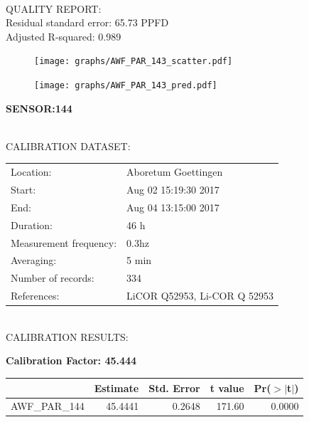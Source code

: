 \documentclass[oneside]{report}
\begin{document}
\hrulefill\\
QUALITY REPORT:\\
Residual standard error: 65.73 PPFD\\
Adjusted R-squared: 0.989



\begin{figure}[H]
  \centering
  \texttt{[image: graphs/AWF\_PAR\_143\_scatter.pdf]}
\end{figure}




\begin{figure}[H]
  \centering
  \texttt{[image: graphs/AWF\_PAR\_143\_pred.pdf]}
\end{figure}

\pagebreak


\begin{center}
\large{\textbf{SENSOR:144}}\\
\end{center}

\hrulefill\\
CALIBRATION DATASET:\\
\begin{table}[h!]
  \centering
  \label{tab:table1}
  \begin{tabular}{ll}
    Location: & Aboretum Goettingen\\ 
    
    
    Start:  & Aug 02 15:19:30 2017 \\
    End:   & Aug 04 13:15:00 2017\\ 
    Duration: & 46 h\\
    Measurement frequency: & 0.3hz\\
    Averaging:  &5 min\\
    Number of records: & 334 \\
    References: & LiCOR Q52953, Li-COR Q 52953 \\
  \end{tabular}
\end{table}

\hrulefill\\
CALIBRATION RESULTS:\\


\begin{center}
\textbf{\large{Calibration Factor: 45.444}}\\
\end{center}
\begin{table}[ht]
\centering
\begin{tabular}{rrrrr}
  \hline
 & Estimate & Std. Error & t value & Pr($>$$|$t$|$) \\ 
  \hline
AWF\_PAR\_144 & 45.4441 & 0.2648 & 171.60 & 0.0000 \\ 
   \hline
\end{tabular}
\end{table}
\end{document}
